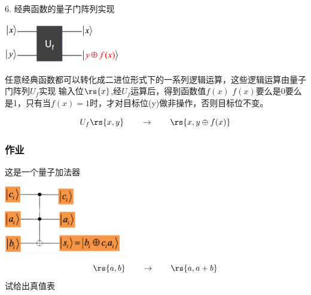 \begin{frame}
    \frametitle{}
    6.  经典函数的量子门阵列实现
    \begin{center}
        \includegraphics[width=0.38\textwidth]{figs/25.png}     
    \end{center} 
    \begin{itemize}
        \IItem 任意经典函数都可以转化成二进位形式下的一系列逻辑运算，这些逻辑运算由量子门阵列$U_f$实现
        \IItem 输入位$\rs{x}$,经$U_f$运算后，得到函数值$f(x)$
        \IItem $f(x)$要么是0要么是1，只有当$f(x)=1$时，才对目标位(y)做非操作，否则目标位不变。
    \end{itemize}
    \[U_f\rs{x,y}\qquad \to \qquad \rs{x,y\oplus f(x)}\]
\end{frame}

\begin{frame}
    \frametitle{作业}
    这是一个量子加法器
    \begin{center}
        \includegraphics[width=0.38\textwidth]{figs/24.png}     
    \end{center} 
    \[\rs{a,b}\qquad \to \qquad \rs{a,a+b}\]
    试给出真值表
\end{frame}
